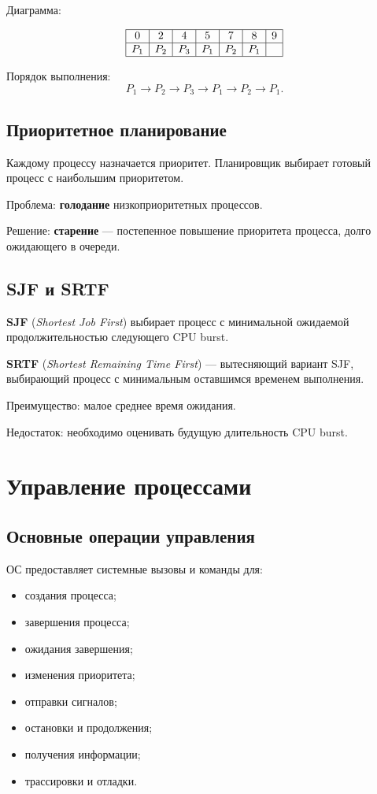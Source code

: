 \documentclass[12pt,a4paper]{article}
\begin{document}
Диаграмма:

\[
\begin{array}{|c|c|c|c|c|c|c|}
\hline
0 & 2 & 4 & 5 & 7 & 8 & 9 \\
\hline
P_1 & P_2 & P_3 & P_1 & P_2 & P_1 & \\
\hline
\end{array}
\]

Порядок выполнения:
\[
P_1 \rightarrow P_2 \rightarrow P_3 \rightarrow P_1 \rightarrow P_2 \rightarrow P_1.
\]

\subsection{Приоритетное планирование}

Каждому процессу назначается приоритет. Планировщик выбирает готовый процесс с наибольшим приоритетом.

Проблема: \textbf{голодание} низкоприоритетных процессов.

Решение: \textbf{старение} --- постепенное повышение приоритета процесса, долго ожидающего в очереди.

\subsection{SJF и SRTF}

\textbf{SJF} (\textit{Shortest Job First}) выбирает процесс с минимальной ожидаемой продолжительностью следующего CPU burst.

\textbf{SRTF} (\textit{Shortest Remaining Time First}) --- вытесняющий вариант SJF, выбирающий процесс с минимальным оставшимся временем выполнения.

Преимущество: малое среднее время ожидания.

Недостаток: необходимо оценивать будущую длительность CPU burst.

\section{Управление процессами}

\subsection{Основные операции управления}

ОС предоставляет системные вызовы и команды для:

\begin{itemize}
    \item создания процесса;
    \item завершения процесса;
    \item ожидания завершения;
    \item изменения приоритета;
    \item отправки сигналов;
    \item остановки и продолжения;
    \item получения информации;
    \item трассировки и отладки.
\end{itemize}
\end{document}
